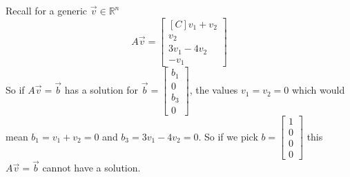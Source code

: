 \begin{example}
\begin{inparaenum}[a.)]
Recall for a generic $\vec{v} \in \mathbb{R}^n$
\[A\vec{v}=\begin{bmatrix*}[C]v_1+v_2\\v_2\\3v_1-4v_2\\-v_1\end{bmatrix*}\]
So if $A\vec{v}=\vec{b}$ has a solution for 
$\vec{b}=\begin{bmatrix*}b_1\\0\\b_3\\0\end{bmatrix*}$, the values $v_1=v_2=0$ 
which would mean $b_1=v_1+v_2=0$ and $b_3=3v_1-4v_2=0$. So if we pick
$b=\begin{bmatrix}1 \\ 0 \\ 0 \\ 0\end{bmatrix}$ this $A\vec{v}=\vec{b}$ 
cannot have a solution.
\end{inparaenum}
\end{example}


